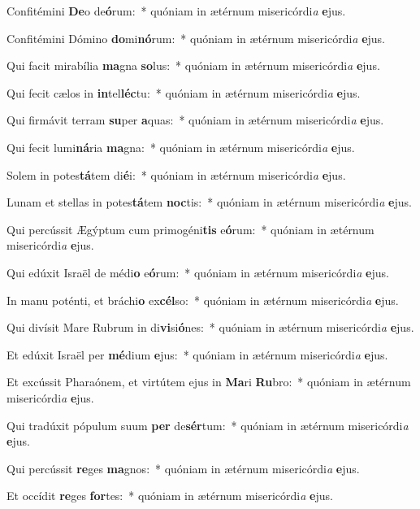 \item Confitémini \textbf{De}o de\textbf{ó}rum:~* quóniam in ætérnum misericórdi\textit{a} \textbf{e}jus.
\item Confitémini Dómino \textbf{do}mi\textbf{nó}rum:~* quóniam in ætérnum misericórdi\textit{a} \textbf{e}jus.
\item Qui facit mirabília \textbf{ma}gna \textbf{so}lus:~* quóniam in ætérnum misericórdi\textit{a} \textbf{e}jus.
\item Qui fecit cælos in \textbf{in}tel\textbf{léc}tu:~* quóniam in ætérnum misericórdi\textit{a} \textbf{e}jus.
\item Qui firmávit terram \textbf{su}per \textbf{a}quas:~* quóniam in ætérnum misericórdi\textit{a} \textbf{e}jus.
\item Qui fecit lumi\textbf{ná}ria \textbf{ma}gna:~* quóniam in ætérnum misericórdi\textit{a} \textbf{e}jus.
\item Solem in potes\textbf{tá}tem di\textbf{é}i:~* quóniam in ætérnum misericórdi\textit{a} \textbf{e}jus.
\item Lunam et stellas in potes\textbf{tá}tem \textbf{noc}tis:~* quóniam in ætérnum misericórdi\textit{a} \textbf{e}jus.
\item Qui percússit Ægýptum cum primogéni\textbf{tis} e\textbf{ó}rum:~* quóniam in ætérnum misericórdi\textit{a} \textbf{e}jus.
\item Qui edúxit Israël de médi\textbf{o} e\textbf{ó}rum:~* quóniam in ætérnum misericórdi\textit{a} \textbf{e}jus.
\item In manu poténti, et bráchi\textbf{o} ex\textbf{cél}so:~* quóniam in ætérnum misericórdi\textit{a} \textbf{e}jus.
\item Qui divísit Mare Rubrum in di\textbf{vi}si\textbf{ó}nes:~* quóniam in ætérnum misericórdi\textit{a} \textbf{e}jus.
\item Et edúxit Israël per \textbf{mé}dium \textbf{e}jus:~* quóniam in ætérnum misericórdi\textit{a} \textbf{e}jus.
\item Et excússit Pharaónem, et virtútem ejus in \textbf{Ma}ri \textbf{Ru}bro:~* quóniam in ætérnum misericórdi\textit{a} \textbf{e}jus.
\item Qui tradúxit pópulum suum \textbf{per} de\textbf{sér}tum:~* quóniam in ætérnum misericórdi\textit{a} \textbf{e}jus.
\item Qui percússit \textbf{re}ges \textbf{ma}gnos:~* quóniam in ætérnum misericórdi\textit{a} \textbf{e}jus.
\item Et occídit \textbf{re}ges \textbf{for}tes:~* quóniam in ætérnum misericórdi\textit{a} \textbf{e}jus.
